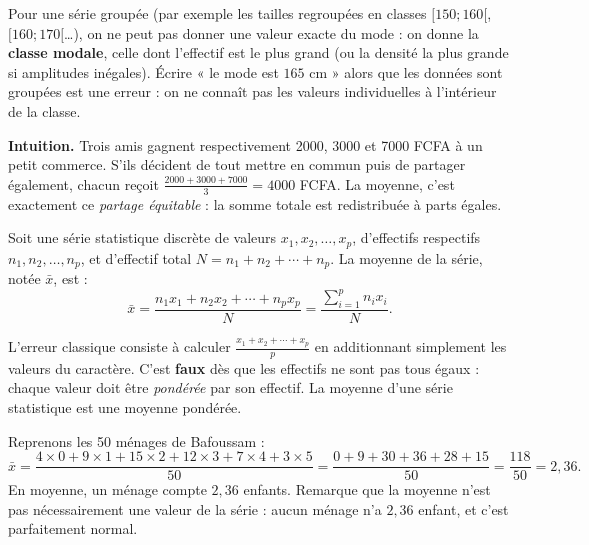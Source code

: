 \documentclass[11pt]{article}
\newcommand{\cle}[1]{{\popxbold\color{popdark}#1}}
\newcounter{popsec}
\newcounter{popsub}
\newcommand{\courssub}[1]{%
  \stepcounter{popsub}%
  \par\vspace{9pt}\noindent{\popxbold\fontsize{11.5}{13}\selectfont\color{popink}{\color{poporange}\thepopsec.\thepopsub}\hspace{6pt}#1}\par\nopagebreak\vspace{4pt}
}
\begin{document}
\begin{attention}
Pour une série groupée (par exemple les tailles regroupées en classes $[150;160[$, $[160;170[$\ldots), on ne peut pas donner une valeur exacte du mode : on donne la \textbf{classe modale}, celle dont l'effectif est le plus grand (ou la densité la plus grande si amplitudes inégales). Écrire « le mode est $165$ cm » alors que les données sont groupées est une erreur : on ne connaît pas les valeurs individuelles à l'intérieur de la classe.
\end{attention}

\courssub{La moyenne : le partage équitable}

\textbf{Intuition.} Trois amis gagnent respectivement \num{2000}, \num{3000} et \num{7000} FCFA à un petit commerce. S'ils décident de tout mettre en commun puis de partager également, chacun reçoit $\frac{2000+3000+7000}{3} = \num{4000}$ FCFA. La moyenne, c'est exactement ce \emph{partage équitable} : la somme totale est redistribuée à parts égales.

\begin{definition}
Soit une série statistique discrète de valeurs $x_1, x_2, \ldots, x_p$, d'effectifs respectifs $n_1, n_2, \ldots, n_p$, et d'effectif total $N = n_1 + n_2 + \cdots + n_p$. La \cle{moyenne} de la série, notée $\bar{x}$, est :
\[ \bar{x} = \frac{n_1 x_1 + n_2 x_2 + \cdots + n_p x_p}{N} = \frac{\displaystyle\sum_{i=1}^{p} n_i x_i}{N}. \]
\end{definition}

\begin{attention}
L'erreur classique consiste à calculer $\frac{x_1 + x_2 + \cdots + x_p}{p}$ en additionnant simplement les valeurs du caractère. C'est \textbf{faux} dès que les effectifs ne sont pas tous égaux : chaque valeur doit être \emph{pondérée} par son effectif. La moyenne d'une série statistique est une \cle{moyenne pondérée}.
\end{attention}

\begin{exemplebox}
Reprenons les 50 ménages de Bafoussam :
\[ \bar{x} = \frac{4\times 0 + 9\times 1 + 15\times 2 + 12\times 3 + 7\times 4 + 3\times 5}{50} = \frac{0+9+30+36+28+15}{50} = \frac{118}{50} = 2{,}36. \]
En moyenne, un ménage compte $2{,}36$ enfants. Remarque que la moyenne n'est pas nécessairement une valeur de la série : aucun ménage n'a $2{,}36$ enfant, et c'est parfaitement normal.
\end{exemplebox}
\end{document}
